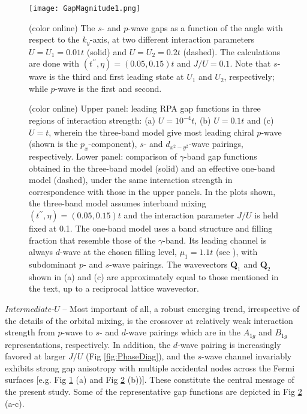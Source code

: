 \documentclass[aps,prl,twocolumn,superscriptaddress,showpacs]{revtex4-1}
\newcommand{\bs}{\boldsymbol}
\begin{document}
\begin{figure}
\texttt{[image: GapMagnitude1.png]}
\caption{(color online) The $s$- and $p$-wave gaps as a function of the angle with respect to the $k_y$-axis, at two different interaction parameters $U=U_1=0.01t$ (solid) and $U=U_2=0.2t$ (dashed). The calculations are done with $(t^{\prime\prime},\eta)=(0.05,0.15)t$ and $J/U=0.1$. Note that $s$-wave is the third and first leading state at $U_1$ and $U_2$, respectively; while $p$-wave is the first and second.}
\label{fig:GapMagnitude}
\end{figure}

\begin{figure}
\caption{(color online) Upper panel: leading RPA gap functions in three regions of interaction strength: (a) $U=10^{-4}t$, (b) $U=0.1t$ and (c) $U=t$, wherein the three-band model give most leading chiral $p$-wave (shown is the $p_x$-component), $s$- and $d_{x^2-y^2}$-wave pairings, respectively. Lower panel: comparison of $\gamma$-band gap functions obtained in the three-band model (solid) and an effective one-band model (dashed), under the same interaction strength in correspondence with those in the upper panels. In the plots shown, the three-band model assumes interband mixing $(t^{\prime\prime},\eta)=(0.05,0.15)t$ and the interaction parameter $J/U$ is held fixed at 0.1. The one-band model uses a band structure and filling fraction that resemble those of the $\gamma$-band. Its leading channel is always $d$-wave at the chosen filling level, $\mu_1=1.1t$ (see ), with subdominant $p$- and $s$-wave pairings. The wavevectors ${\bs Q_1}$ and ${\bs Q_2}$ shown in (a) and (c) are approximately equal to those mentioned in the text, up to a reciprocal lattice wavevector.}
\label{fig:onebandGamma}
\end{figure}


{\it Intermediate-$U$} -- Most important of all, a robust emerging trend, irrespective of the details of the orbital mixing, is the crossover at relatively weak interaction strength from $p$-wave to $s$- and $d$-wave pairings which are in the $A_{1g}$ and $B_{1g}$ representations, respectively. In addition, the $d$-wave pairing is increasingly favored at larger $J/U$  (Fig \ref{fig:PhaseDiag}), and the $s$-wave channel invariably exhibits strong gap anisotropy with multiple accidental nodes across the Fermi surfaces [e.g. Fig \ref{fig:GapMagnitude} (a) and Fig \ref{fig:onebandGamma} (b))]. These constitute the central message of the present study. Some of the representative gap functions are depicted in Fig \ref{fig:onebandGamma} (a-c).
\end{document}
